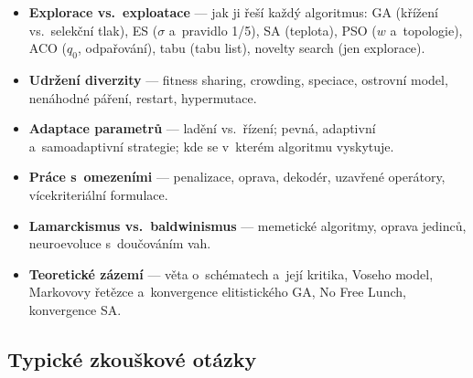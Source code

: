 \documentclass[11pt,a4paper]{article}
\theoremstyle{definition}
\begin{document}
\begin{itemize}
\item \textbf{Explorace vs.\ exploatace} --- jak ji řeší každý algoritmus:
  GA (křížení vs.\ selekční tlak), ES ($\sigma$ a~pravidlo 1/5), SA (teplota),
  PSO ($w$ a~topologie), ACO ($q_0$, odpařování), tabu (tabu list),
  novelty search (jen explorace).
\item \textbf{Udržení diverzity} --- fitness sharing, crowding, speciace,
  ostrovní model, nenáhodné páření, restart, hypermutace.
\item \textbf{Adaptace parametrů} --- ladění vs.\ řízení; pevná, adaptivní
  a~samoadaptivní strategie; kde se v~kterém algoritmu vyskytuje.
\item \textbf{Práce s~omezeními} --- penalizace, oprava, dekodér, uzavřené
  operátory, vícekriteriální formulace.
\item \textbf{Lamarckismus vs.\ baldwinismus} --- memetické algoritmy,
  oprava jedinců, neuroevoluce s~douč\-ováním vah.
\item \textbf{Teoretické zázemí} --- věta o~schématech a~její kritika, Voseho
  model, Markovovy řetězce a~konvergence elitistického GA, No Free Lunch,
  konvergence SA.
\end{itemize}

\subsection*{Typické zkouškové otázky}
\end{document}
